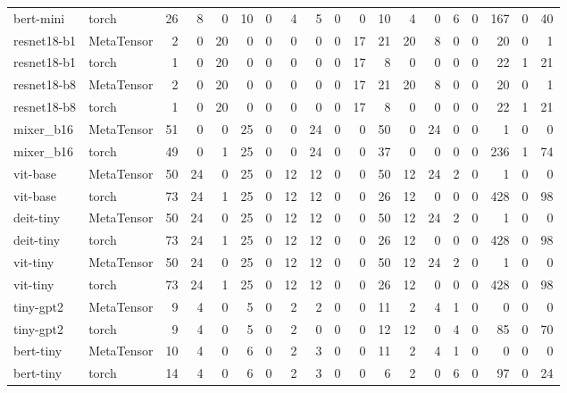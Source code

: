 \begin{tabular}{llrrrrrrrrrrrrrrrrr}
bert-mini & torch & 26 & 8 & 0 & 10 & 0 & 4 & 5 & 0 & 0 & 10 & 4 & 0 & 6 & 0 & 167 & 0 & 40 \\
resnet18-b1 & MetaTensor & 2 & 0 & 20 & 0 & 0 & 0 & 0 & 0 & 17 & 21 & 20 & 8 & 0 & 0 & 20 & 0 & 1 \\
resnet18-b1 & torch & 1 & 0 & 20 & 0 & 0 & 0 & 0 & 0 & 17 & 8 & 0 & 0 & 0 & 0 & 22 & 1 & 21 \\
resnet18-b8 & MetaTensor & 2 & 0 & 20 & 0 & 0 & 0 & 0 & 0 & 17 & 21 & 20 & 8 & 0 & 0 & 20 & 0 & 1 \\
resnet18-b8 & torch & 1 & 0 & 20 & 0 & 0 & 0 & 0 & 0 & 17 & 8 & 0 & 0 & 0 & 0 & 22 & 1 & 21 \\
mixer\_b16 & MetaTensor & 51 & 0 & 0 & 25 & 0 & 0 & 24 & 0 & 0 & 50 & 0 & 24 & 0 & 0 & 1 & 0 & 0 \\
mixer\_b16 & torch & 49 & 0 & 1 & 25 & 0 & 0 & 24 & 0 & 0 & 37 & 0 & 0 & 0 & 0 & 236 & 1 & 74 \\
vit-base & MetaTensor & 50 & 24 & 0 & 25 & 0 & 12 & 12 & 0 & 0 & 50 & 12 & 24 & 2 & 0 & 1 & 0 & 0 \\
vit-base & torch & 73 & 24 & 1 & 25 & 0 & 12 & 12 & 0 & 0 & 26 & 12 & 0 & 0 & 0 & 428 & 0 & 98 \\
deit-tiny & MetaTensor & 50 & 24 & 0 & 25 & 0 & 12 & 12 & 0 & 0 & 50 & 12 & 24 & 2 & 0 & 1 & 0 & 0 \\
deit-tiny & torch & 73 & 24 & 1 & 25 & 0 & 12 & 12 & 0 & 0 & 26 & 12 & 0 & 0 & 0 & 428 & 0 & 98 \\
vit-tiny & MetaTensor & 50 & 24 & 0 & 25 & 0 & 12 & 12 & 0 & 0 & 50 & 12 & 24 & 2 & 0 & 1 & 0 & 0 \\
vit-tiny & torch & 73 & 24 & 1 & 25 & 0 & 12 & 12 & 0 & 0 & 26 & 12 & 0 & 0 & 0 & 428 & 0 & 98 \\
tiny-gpt2 & MetaTensor & 9 & 4 & 0 & 5 & 0 & 2 & 2 & 0 & 0 & 11 & 2 & 4 & 1 & 0 & 0 & 0 & 0 \\
tiny-gpt2 & torch & 9 & 4 & 0 & 5 & 0 & 2 & 0 & 0 & 0 & 12 & 12 & 0 & 4 & 0 & 85 & 0 & 70 \\
bert-tiny & MetaTensor & 10 & 4 & 0 & 6 & 0 & 2 & 3 & 0 & 0 & 11 & 2 & 4 & 1 & 0 & 0 & 0 & 0 \\
bert-tiny & torch & 14 & 4 & 0 & 6 & 0 & 2 & 3 & 0 & 0 & 6 & 2 & 0 & 6 & 0 & 97 & 0 & 24 \\
\bottomrule
\end{tabular}

